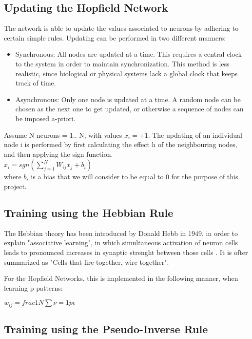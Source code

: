 \documentclass[11pt,a4paper,oneside]{report}
\begin{document}
\subsection{Updating the Hopfield Network}

The network is able to update the values associated to neurons by adhering to certain simple rules. Updating can be performed in two different manners:
\begin{itemize}
 \item Synchronous: All nodes are updated at a time. This requires a central clock to the system in order to maintain synchronization. This method is less realistic, since biological or physical systems lack a global clock that keeps track of time. 
 \item Asynchronous: Only one node is updated at a time. A random node can be chosen as the next one to get updated, or otherwise a sequence of nodes can be imposed a-priori.
\end{itemize}

Assume N neurons = 1.. N, with values \(x_{i} = \pm1\). The updating of an individual node i is performed by first calculating the effect h of the neighbouring nodes, and then applying the sign function. \\

\begin{math}
 x_{i} = sgn(\sum_{j=1}^{N}W_{ij}x_{j} + b_{i})
\end{math}\\

where \( b_{i} \) is a bias that we will consider to be equal to 0 for the purpose of this project.

\subsection{Training using the Hebbian Rule}

The Hebbian theory has been introduced by Donald Hebb in 1949, in order to explain "associative learning", in which simultaneous activation of neuron cells leads to pronounced increases in synaptic strenght between those cells \cite{hebb_wiki}. It is ofter summarized as "Cells that fire together, wire together". 

For the Hopfield Networks, this is implemented in the following manner, when learning p patterns:

\( w_{ij}=frac{1}{N}\sum{\nu=1}{p}\epsilon \)

\subsection{Training using the Pseudo-Inverse Rule}
\end{document}

